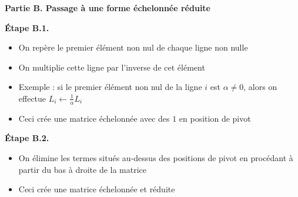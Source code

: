 \begin{frame}
\textbf{Partie B. Passage à une forme échelonnée réduite}  

\pause
\medskip

\textbf{\'Etape B.1.}  

\pause
\begin{itemize}
  \item On repère le premier élément non nul de chaque ligne non nulle
  \pause
  \item On multiplie cette ligne par l'inverse de cet élément
  \pause
  \item Exemple : si le premier élément non nul de la ligne $i$ est $\alpha\neq0$, alors
on effectue $L_i \leftarrow \frac1\alpha L_i$
  \pause
  \item Ceci crée une matrice échelonnée avec des $1$ en position de pivot
  
\end{itemize}

\pause
\medskip
\textbf{\'Etape B.2.}  

\pause
\begin{itemize}
  \item On élimine les termes situés au-dessus des positions de pivot 
en procédant à partir du bas à droite de la matrice
  \pause
  \item Ceci crée une matrice échelonnée et réduite
\end{itemize}

\end{frame}


